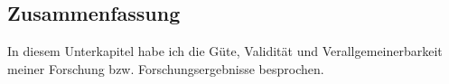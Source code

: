 \subsection{Zusammenfassung}

In diesem Unterkapitel habe ich die Güte, Validität und Verallgemeinerbarkeit meiner Forschung bzw. Forschungsergebnisse besprochen.

